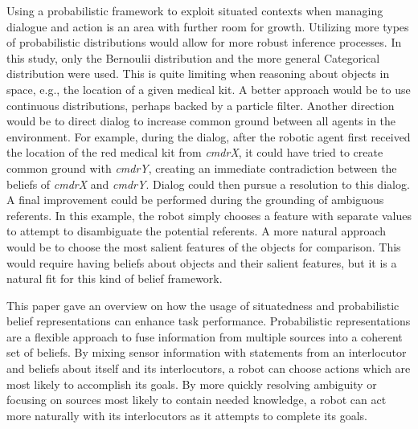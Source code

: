 \documentclass[12pt]{article}
\begin{document}
Using a probabilistic framework to exploit situated contexts when
managing dialogue and action is an area with further room for growth.
Utilizing more types of probabilistic distributions would allow for
more robust inference processes. In this study, only the Bernoulii
distribution and the more general Categorical distribution were
used. This is quite limiting when reasoning about objects in space,
e.g., the location of a given medical kit. A better approach would be
to use continuous distributions, perhaps backed by a particle filter.
Another direction would be to direct dialog to increase common ground
between all agents in the environment. For example, during the dialog,
after the robotic agent first received the location of the red medical
kit from \textit{cmdrX}, it could have tried to create common ground with
\textit{cmdrY}, creating an immediate contradiction between the beliefs of
\textit{cmdrX} and \textit{cmdrY}. Dialog could then pursue a resolution to this
dialog. A final improvement could be performed during the grounding of
ambiguous referents. In this example, the robot simply chooses a
feature with separate values to attempt to disambiguate the potential
referents. A more natural approach would be to choose the most salient
features of the objects for comparison. This would require having
beliefs about objects and their salient features, but it is a natural
fit for this kind of belief framework.

This paper gave an overview on how the usage of situatedness and
probabilistic belief representations can enhance task
performance. Probabilistic representations are a flexible approach to
fuse information from multiple sources into a coherent set of
beliefs. By mixing sensor information with statements from an
interlocutor and beliefs about itself and its interlocutors, a robot
can choose actions which are most likely to accomplish its goals. By
more quickly resolving ambiguity or focusing on sources most likely to
contain needed knowledge, a robot can act more naturally with its
interlocutors as it attempts to complete its goals.

{\small }
\end{document}
